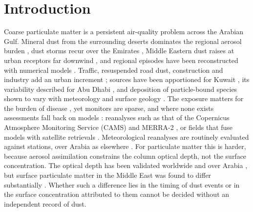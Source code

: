 \section{Introduction}
\label{sec:intro}

Coarse particulate matter is a persistent air-quality problem across the Arabian Gulf. Mineral
dust from the surrounding deserts dominates the regional aerosol burden
\citep{gandham2020,shahid2026}, dust storms recur over the Emirates
\citep{barbulescu2020,karagulian2019}, Middle Eastern dust raises \pmten{} at urban receptors far
downwind \citep{givehchi2013,salmabadi2023}, and regional episodes have been reconstructed with
numerical models \citep{sulaymon2026}. Traffic, resuspended road dust, construction and industry
add an urban increment \citep{thorpe2008,amato2009,harrison2021,lenschow2001}; \pmten{} sources have
been apportioned for Kuwait \citep{hopke2026}, its variability described for Abu Dhabi
\citep{abuelgasim2020}, and deposition of particle-bound species shown to vary with meteorology and
surface geology \citep{bae2025be7}. The exposure matters for the burden of disease
\citep{cohen2017,lelieveled2015,chen2020,orellano2020,karanasiou2012}, yet monitors are sparse,
and where none exists assessments fall back on models \citep{shin2026resilient}: reanalyses such
as that of the Copernicus Atmosphere Monitoring Service (CAMS)
\citep{inness2019,flemming2015,morcrette2009} and MERRA-2 \citep{gelaro2017,randles2017}, or
fields that fuse models with satellite retrievals \citep{van_donkelaar2016,hammer2020}.
Meteorological reanalyses are routinely evaluated against stations, over Arabia as elsewhere
\citep{ullah2024,gomiscebolla2023}. For particulate matter this is harder, because aerosol
assimilation constrains the column optical depth, not the surface concentration. The optical
depth has been validated worldwide and over Arabia \citep{eskes2015,gueymard2020,labban2023}, but
surface particulate matter in the Middle East was found to differ substantially \citep{ukhov2020}.
Whether such a difference lies in the timing of dust events or in the surface concentration
attributed to them cannot be decided without an independent record of dust.

